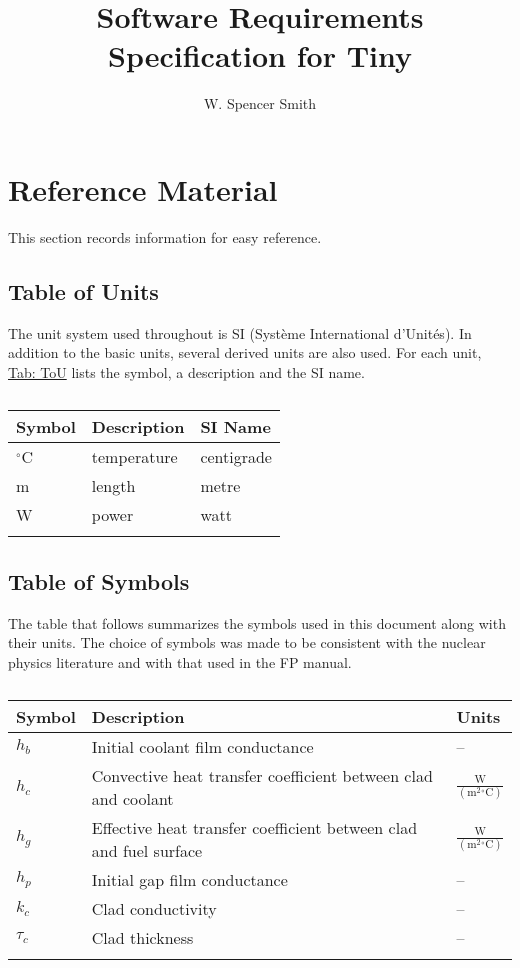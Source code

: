 \documentclass[12pt]{article}
\title{Software Requirements Specification for Tiny}
\author{W. Spencer Smith}
\begin{document}
\maketitle
\tableofcontents
\newpage
\section{Reference Material}
\label{Sec:RefMat}
This section records information for easy reference.
\subsection{Table of Units}
\label{Sec:ToU}
The unit system used throughout is SI (Système International d'Unités). In addition to the basic units, several derived units are also used. For each unit, \hyperref[Table:ToU]{Tab: ToU} lists the symbol, a description and the SI name.
\begin{longtable}{l l l}
\toprule
Symbol & Description & SI Name
\\
\midrule
\endhead
${}^{\circ}$C & temperature & centigrade
\\
m & length & metre
\\
W & power & watt
\\
\bottomrule
\caption{}
\label{Table:ToU}
\end{longtable}
\subsection{Table of Symbols}
\label{Sec:ToS}
The table that follows summarizes the symbols used in this document along with their units. The choice of symbols was made to be consistent with the nuclear physics literature and with that used in the FP manual.
\begin{longtabu}{l X[l] l}
\toprule
Symbol & Description & Units
\\
\midrule
\endhead
${h_{b}}$ & Initial coolant film conductance & --
\\
${h_{c}}$ & Convective heat transfer coefficient between clad and coolant & $\frac{\text{W}}{(\text{m}^{2}{}^{\circ}\text{C})}$
\\
${h_{g}}$ & Effective heat transfer coefficient between clad and fuel surface & $\frac{\text{W}}{(\text{m}^{2}{}^{\circ}\text{C})}$
\\
${h_{p}}$ & Initial gap film conductance & --
\\
${k_{c}}$ & Clad conductivity & --
\\
${τ_{c}}$ & Clad thickness & --
\\
\bottomrule
\caption{}
\label{Table:ToS}
\end{longtabu}
\end{document}
